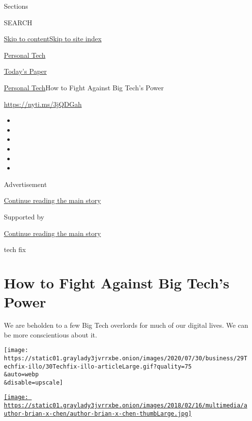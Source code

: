 Sections

SEARCH

\protect\hyperlink{site-content}{Skip to
content}\protect\hyperlink{site-index}{Skip to site index}

\href{https://www.nytimes3xbfgragh.onion/section/technology/personaltech}{Personal
Tech}

\href{https://myaccount.nytimes3xbfgragh.onion/auth/login?response_type=cookie\&client_id=vi}{}

\href{https://www.nytimes3xbfgragh.onion/section/todayspaper}{Today's
Paper}

\href{/section/technology/personaltech}{Personal Tech}\textbar{}How to
Fight Against Big Tech's Power

\href{https://nyti.ms/3jQDGah}{https://nyti.ms/3jQDGah}

\begin{itemize}
\item
\item
\item
\item
\item
\item
\end{itemize}

Advertisement

\protect\hyperlink{after-top}{Continue reading the main story}

Supported by

\protect\hyperlink{after-sponsor}{Continue reading the main story}

tech fix

\hypertarget{how-to-fight-against-big-techs-power}{%
\section{How to Fight Against Big Tech's
Power}\label{how-to-fight-against-big-techs-power}}

We are beholden to a few Big Tech overlords for much of our digital
lives. We can be more conscientious about it.

\texttt{[image: https://static01.graylady3jvrrxbe.onion/images/2020/07/30/business/29Techfix-illo/30Techfix-illo-articleLarge.gif?quality=75\\\&auto=webp\\\&disable=upscale]}

\href{https://www.nytimes3xbfgragh.onion/by/brian-x-chen}{\texttt{[image: https://static01.graylady3jvrrxbe.onion/images/2018/02/16/multimedia/author-brian-x-chen/author-brian-x-chen-thumbLarge.jpg]}}

